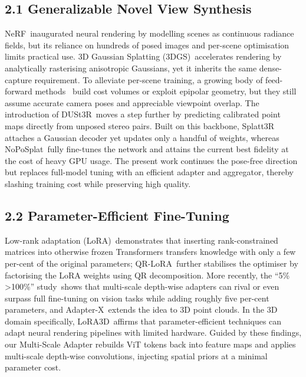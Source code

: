\documentclass[letterpaper]{article} %
\begin{document}
\subsection{2.1 Generalizable Novel View Synthesis}
NeRF\,\cite{mildenhall2021nerf} inaugurated neural rendering by modelling scenes as continuous radiance fields, but its reliance on hundreds of posed images and per-scene optimisation limits practical use.  3D Gaussian Splatting (3DGS)\,\cite{kerbl20233d} accelerates rendering by analytically rasterising anisotropic Gaussians, yet it inherits the same dense-capture requirement.  To alleviate per-scene training, a growing body of feed-forward methods~\cite{yu2021pixelnerf,wang2021ibrnet,chen2021mvsnerf,johari2022geonerf,xu2023wavenerf,charatan2024pixelsplat,chen2024mvsplat} build cost volumes or exploit epipolar geometry, but they still assume accurate camera poses and appreciable viewpoint overlap.  
The introduction of DUSt3R\,\cite{wang2024dust3r} moves a step further by predicting calibrated point maps directly from unposed stereo pairs.  Built on this backbone, Splatt3R\,\cite{smart2024splatt3r} attaches a Gaussian decoder yet updates only a handful of weights, whereas NoPoSplat\,\cite{ye2024no} fully fine-tunes the network and attains the current best fidelity at the cost of heavy GPU usage.  The present work continues the pose-free direction but replaces full-model tuning with an efficient adapter and aggregator, thereby slashing training cost while preserving high quality.

\subsection{2.2 Parameter-Efficient Fine-Tuning}
Low-rank adaptation (LoRA)\,\cite{hu2022lora} demonstrates that inserting rank-constrained matrices into otherwise frozen Transformers transfers knowledge with only a few per-cent of the original parameters; QR-LoRA\,\cite{yang2025qr} further stabilises the optimiser by factorising the LoRA weights using QR decomposition.  More recently, the “5\% \textgreater 100\%” study\,\cite{yin20255} shows that multi-scale depth-wise adapters can rival or even surpass full fine-tuning on vision tasks while adding roughly five per-cent parameters, and Adapter-X\,\cite{li2024adapter} extends the idea to 3D point clouds.  In the 3D domain specifically, LoRA3D\,\cite{lu2024lora3d} affirms that parameter-efficient techniques can adapt neural rendering pipelines with limited hardware.  Guided by these findings, our Multi-Scale Adapter rebuilds ViT tokens back into feature maps and applies multi-scale depth-wise convolutions, injecting spatial priors at a minimal parameter cost.
\end{document}
